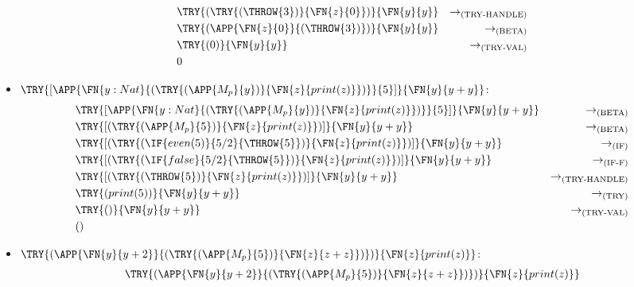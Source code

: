 \begin{itemize}
\begin{align*}
		       & \TRY{(\TRY{(\THROW{3})}{\FN{z}{0}})}{\FN{y}{y}}
		       & \to_{\text{(TRY-HANDLE)}}                                                                 \\
		       & \TRY{(\APP{\FN{z}{0}}{(\THROW{3})})}{\FN{y}{y}}
		       & \to_{\text{(BETA)}}                                                                       \\
		       & \TRY{(0)}{\FN{y}{y}}
		       & \to_{\text{(TRY-VAL)}}                                                                    \\
		       & 0
	      \end{align*}
	\item $\TRY{[\APP{\FN{y:Nat}{(\TRY{(\APP{M_p}{y})}{\FN{z}{print(z)}})}}{5}]}{\FN{y}{y+y}}$:
	      \begin{align*}
		       & \TRY{[\APP{\FN{y:Nat}{(\TRY{(\APP{M_p}{y})}{\FN{z}{print(z)}})}}{5}]}{\FN{y}{y+y}}
		       & \to_{\text{(BETA)}}                                                                \\
		       & \TRY{[(\TRY{(\APP{M_p}{5})}{\FN{z}{print(z)}})]}{\FN{y}{y+y}}
		       & \to_{\text{(BETA)}}                                                                \\
		       & \TRY{[(\TRY{(\IF{even(5)}{5/2}{\THROW{5}})}{\FN{z}{print(z)}})]}{\FN{y}{y+y}}
		       & \to_{\text{(IF)}}                                                                  \\
		       & \TRY{[(\TRY{(\IF{false}{5/2}{\THROW{5}})}{\FN{z}{print(z)}})]}{\FN{y}{y+y}}
		       & \to_{\text{(IF-F)}}                                                                \\
		       & \TRY{[(\TRY{(\THROW{5})}{\FN{z}{print(z)}})]}{\FN{y}{y+y}}
		       & \to_{\text{(TRY-HANDLE)}}                                                          \\
		       & \TRY{(print(5))}{\FN{y}{y+y}}
		       & \to_{\text{(TRY)}}                                                                 \\
		       & \TRY{()}{\FN{y}{y+y}}
		       & \to_{\text{(TRY-VAL)}}                                                             \\
		       & ()
	      \end{align*}
	\item $\TRY{(\APP{\FN{y}{y+2}}{(\TRY{(\APP{M_p}{5})}{\FN{z}{z+z}})})}{\FN{z}{print(z)}}$:
	      \begin{align*}
		       & \TRY{(\APP{\FN{y}{y+2}}{(\TRY{(\APP{M_p}{5})}{\FN{z}{z+z}})})}{\FN{z}{print(z)}}                 \\

\end{align*}
\end{itemize}
